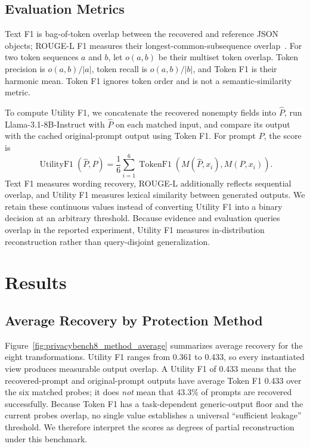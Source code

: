 \documentclass[letterpaper]{article} %
\begin{document}
\subsection{Evaluation Metrics}

Text F1 is bag-of-token overlap between the recovered and reference JSON objects; ROUGE-L F1 measures their longest-common-subsequence overlap~\citep{lin2004rouge}.  For two token sequences \(a\) and \(b\), let \(o(a,b)\) be their multiset token overlap.  Token precision is \(o(a,b)/|a|\), token recall is \(o(a,b)/|b|\), and Token F1 is their harmonic mean.  Token F1 ignores token order and is not a semantic-similarity metric.

To compute Utility F1, we concatenate the recovered nonempty fields into \(\hat{P}\), run Llama-3.1-8B-Instruct with \(\hat{P}\) on each matched input, and compare its output with the cached original-prompt output using Token F1.  For prompt \(P\), the score is
\[
\operatorname{UtilityF1}(\hat{P},P)=\frac{1}{6}\sum_{i=1}^{6}\operatorname{TokenF1}(M(\hat{P},x_i),M(P,x_i)).
\]
Text F1 measures wording recovery, ROUGE-L additionally reflects sequential overlap, and Utility F1 measures lexical similarity between generated outputs.  We retain these continuous values instead of converting Utility F1 into a binary decision at an arbitrary threshold.  Because evidence and evaluation queries overlap in the reported experiment, Utility F1 measures in-distribution reconstruction rather than query-disjoint generalization.

\section{Results}

\subsection{Average Recovery by Protection Method}

Figure~\ref{fig:privacybench8_method_average} summarizes average recovery for the eight transformations.  Utility F1 ranges from 0.361 to 0.433, so every instantiated view produces measurable output overlap.  A Utility F1 of 0.433 means that the recovered-prompt and original-prompt outputs have average Token F1 0.433 over the six matched probes; it does \emph{not} mean that 43.3\% of prompts are recovered successfully.  Because Token F1 has a task-dependent generic-output floor and the current probes overlap, no single value establishes a universal ``sufficient leakage'' threshold.  We therefore interpret the scores as degrees of partial reconstruction under this benchmark.
\end{document}
